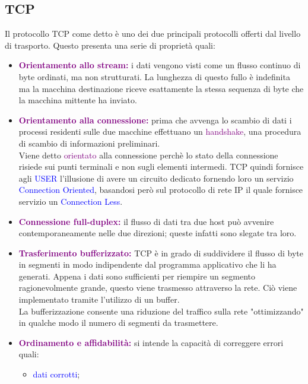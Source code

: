 \subsection{TCP}
Il protocollo TCP come detto è uno dei due principali protocolli offerti dal livello di trasporto.
Questo presenta una serie di proprietà quali:
\begin{itemize}
    \item \textbf{\textcolor{purple}{Orientamento allo stream:}} i dati vengono visti come un flusso continuo di byte ordinati, ma non strutturati. 
    La lunghezza di questo fullo è indefinita ma la macchina destinazione riceve esattamente la stessa sequenza di byte che la macchina mittente ha inviato.
    \item \textbf{\textcolor{purple}{Orientamento alla connessione:}} prima che avvenga lo scambio di dati i processi residenti sulle due macchine effettuano un \textcolor{purple}{handshake}, una procedura di scambio di informazioni preliminari. 
    \\Viene detto \textcolor{purple}{orientato} alla connessione perchè lo stato della connessione risiede sui punti terminali e non sugli elementi intermedi.
    TCP quindi fornisce agli \textcolor{blue}{USER} l'illusione di avere un circuito dedicato fornendo loro un servizio \textcolor{blue}{Connection Oriented}, basandosi però sul protocollo di rete IP il quale fornisce servizio un \textcolor{blue}{Connection Less}.
    \item \textbf{\textcolor{purple}{Connessione full-duplex:}} il flusso di dati tra due host può avvenire contemporaneamente nelle due direzioni; queste infatti sono slegate tra loro.
    \item \textbf{\textcolor{purple}{Trasferimento bufferizzato:}} TCP è in grado di suddividere il flusso di byte in segmenti in modo indipendente dal programma applicativo che li ha generati. 
    Appena i dati sono sufficienti per riempire un segmento ragionevolmente grande, questo viene trasmesso attraverso la rete. Ciò viene implementato tramite l'utilizzo di un buffer.
    \\La bufferizzazione consente una riduzione del traffico sulla rete "ottimizzando" in qualche modo il numero di segmenti da trasmettere.
    \item \textbf{\textcolor{purple}{Ordinamento e affidabilità:}} si intende la capacità di correggere errori quali:
    \begin{itemize}
        \item \textcolor{blue}{dati corrotti};

\end{itemize}
\end{itemize}
